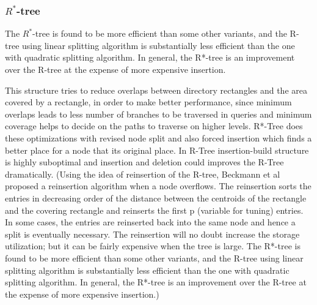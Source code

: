 \documentclass[a4paper,12pt]{article}
\begin{document}
\subsubsection{$R^*$-tree}
The $R^*$-tree is found to be more efficient than some other variants, and the R-tree using linear splitting algorithm is substantially less efficient than the one with quadratic splitting algorithm. In general, the R*-tree is an improvement over the R-tree at the expense of more expensive insertion.

This structure tries to reduce overlaps between directory rectangles and the area covered by a rectangle, in order to make better performance, since minimum overlaps leads to less number of branches to be traversed in queries and minimum coverage helps to decide on the paths to traverse on higher levels. 
R*-Tree does these optimizations with revised node split and also forced insertion which finds a better place for a node that its original place. In R-Tree insertion-build structure is highly suboptimal and insertion and deletion could improves the R-Tree dramatically.
 (Using the idea of reinsertion of the R-tree, Beckmann et al proposed a reinsertion algorithm when a node overflows. The reinsertion sorts the entries in decreasing order of the distance between the centroids of the rectangle and the covering rectangle and reinserts the first p (variable for tuning) entries. In some cases, the entries are reinserted back into the same node and hence a split is eventually necessary. The reinsertion will no doubt increase the storage utilization; but it can be fairly expensive when the tree is large. The R*-tree is found to be more efficient than some other variants, and the R-tree using linear splitting algorithm is substantially less efficient than the one with quadratic splitting algorithm. In general, the R*-tree is an improvement over the R-tree at the expense of more expensive insertion.)
\end{document}
